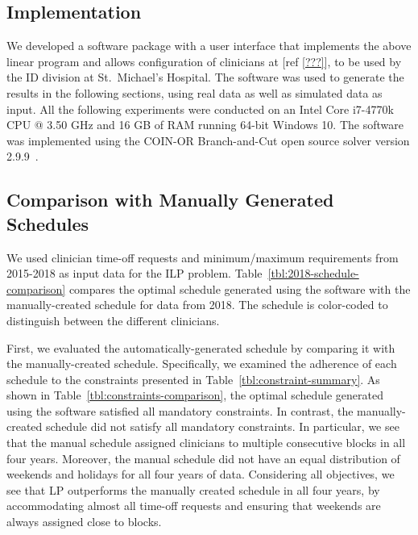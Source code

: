\subsection{Implementation}
We developed a software package with a user interface that implements the above
linear program and allows configuration of clinicians at [ref \ref{???}], to be
used by the ID division at St.\ Michael's Hospital. The software was used to
generate the results in the following sections, using real data as well as
simulated data as input. All the following experiments were conducted on an
Intel Core i7-4770k CPU @ 3.50 GHz and 16 GB of RAM running 64-bit Windows 10.
The software was implemented using the COIN-OR Branch-and-Cut open source solver
version 2.9.9~\cite{johnjforrest_coin-or/cbc:_2019}.

\subsection{Comparison with Manually Generated Schedules}  %
We used clinician time-off requests and minimum/maximum requirements from
2015-2018 as input data for the ILP problem.
Table~\ref{tbl:2018-schedule-comparison} compares the optimal schedule generated using
the software with the manually-created schedule for data from 2018. The
schedule is color-coded to distinguish between the different clinicians.



First, we evaluated the automatically-generated schedule by comparing it with the
manually-created schedule. Specifically, we examined the adherence of each
schedule to the constraints presented in Table~\ref{tbl:constraint-summary}. As
shown in Table~\ref{tbl:constraints-comparison}, the optimal schedule generated
using the software satisfied all mandatory constraints. In contrast, the
manually-created schedule did not satisfy all mandatory constraints. In
particular, we see that the manual schedule assigned clinicians to multiple
consecutive blocks in all four years. Moreover, the manual schedule did not have
an equal distribution of weekends and holidays for all four years of data.
Considering all objectives, we see that LP outperforms the manually created
schedule in all four years, by accommodating almost all time-off requests and
ensuring that weekends are always assigned close to blocks.

